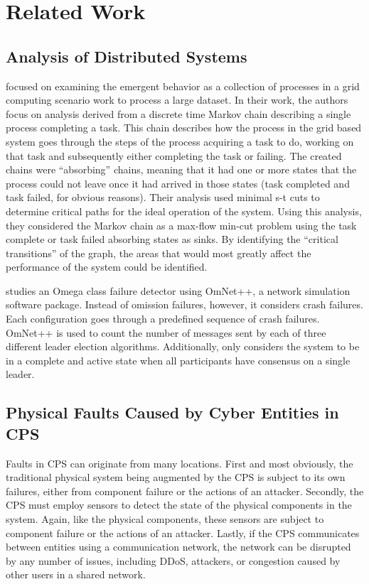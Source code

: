 

\chapter{Related Work}

\section{Analysis of Distributed Systems}

\cite{markov-distributed} focused on examining the emergent behavior as a collection of processes in a grid computing scenario work to process a large dataset.
In their work, the authors focus on analysis derived from a discrete time Markov chain describing a single process completing a task.
This chain describes how the process in the grid based system goes through the steps of the process acquiring a task to do, working on that task and subsequently either completing the task or failing.
The created chains were ``absorbing'' chains, meaning that it had one or more states that the process could not leave once it had arrived in those states (task completed and task failed, for obvious reasons).
Their analysis used minimal s-t cuts to determine critical paths for the ideal operation of the system.
Using this analysis, they considered the Markov chain as a max-flow min-cut problem using the task complete or task failed absorbing states as sinks.
By identifying the ``critical transitions'' of the graph, the areas that would most greatly affect the performance of the system could be identified.

\cite{LEADERELECTIONEVAL} studies an Omega class failure detector using OmNet++\cite{OMNET}, a network simulation software package. Instead of omission failures, however, it considers crash failures. Each configuration goes through a predefined sequence of crash failures. OmNet++ is used to count the number of messages sent by each of three different leader election algorithms. Additionally, \cite{LEADERELECTIONEVAL} only considers the system to be in a complete and active state when all participants have consensus on a single leader.

\section{Physical Faults Caused by Cyber Entities in CPS}

Faults in \ac{CPS} can originate from many locations.
First and most obviously, the traditional physical system being augmented by the CPS is subject to its own failures, either from component failure or the actions of an attacker.
Secondly, the \ac{CPS} must employ sensors to detect the state of the physical components in the system.
Again, like the physical components, these sensors are subject to component failure or the actions of an attacker.
Lastly, if the \ac{CPS} communicates between entities using a communication network, the network can be disrupted by any number of issues, including DDoS, attackers, or congestion caused by other users in a shared network.

